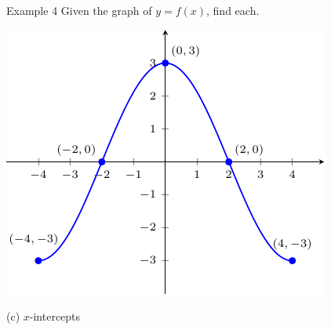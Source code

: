 \documentclass[t,usenames,dvipsnames]{beamer}
\begin{document}
\begin{frame}{Example 4}
Given the graph of $y=f(x)$, find each. \newline\\
\begin{minipage}{0.6\textwidth}
\includegraphics{example4.pdf}
\end{minipage}
\hspace{0.5cm}
\begin{minipage}{0.33\textwidth}
(c) $x$-intercepts  \\\\
 \\\\
 \\\\
\end{minipage}
\end{frame}
\end{document}
